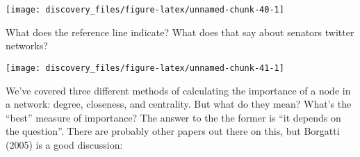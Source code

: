 \documentclass[]{book}
\newenvironment{Shaded}{\begin{snugshade}}{\end{snugshade}}
\newcommand{\KeywordTok}[1]{\textcolor[rgb]{0.13,0.29,0.53}{\textbf{#1}}}
\newcommand{\DataTypeTok}[1]{\textcolor[rgb]{0.13,0.29,0.53}{#1}}
\newcommand{\DecValTok}[1]{\textcolor[rgb]{0.00,0.00,0.81}{#1}}
\newcommand{\StringTok}[1]{\textcolor[rgb]{0.31,0.60,0.02}{#1}}
\newcommand{\OtherTok}[1]{\textcolor[rgb]{0.56,0.35,0.01}{#1}}
\newcommand{\OperatorTok}[1]{\textcolor[rgb]{0.81,0.36,0.00}{\textbf{#1}}}
\newcommand{\NormalTok}[1]{#1}
\theoremstyle{definition}
\theoremstyle{definition}
\theoremstyle{definition}
\theoremstyle{remark}
\begin{document}
\begin{center}\texttt{[image: discovery\_files/figure-latex/unnamed-chunk-40-1]} \end{center}

What does the reference line indicate? What does that say about senators
twitter networks?

\begin{Shaded}
\end{Shaded}

\begin{center}\texttt{[image: discovery\_files/figure-latex/unnamed-chunk-41-1]} \end{center}

We've covered three different methods of calculating the importance of a
node in a network: degree, closeness, and centrality. But what do they
mean? What's the ``best'' measure of importance? The answer to the the
former is ``it depends on the question''. There are probably other
papers out there on this, but Borgatti (2005) is a good discussion:
\end{document}
